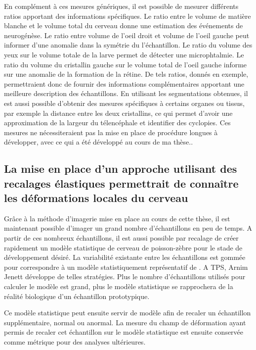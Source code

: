 \documentclass[\main/main.tex]{subfiles}
\begin{document}
En complément à ces mesures génériques, il est possible de mesurer différents ratios apportant des informations spécifiques. Le ratio entre le volume de matière blanche et le volume total du cerveau donne une estimation des événements de neurogénèse. Le ratio entre volume de l'oeil droit et volume de l'oeil gauche peut informer d'une anomalie dans la symétrie du l'échantillon. Le ratio du volume des yeux sur le volume totale de la larve permet de détecter une microphtalmie.
Le ratio du volume du cristallin gauche sur le volume total de l'oeil gauche informe sur une anomalie de la formation de la rétine.
%
De tels ratios, donnés en exemple, permettraient donc de fournir des informations complémentaires apportant une meilleure description des échantillons.
En utilisant les segmentations obtenues, il est aussi possible d'obtenir des mesures spécifiques à certains organes ou tissus, par exemple la distance entre les deux cristallins, ce qui permet d'avoir une approximation de la largeur du télencéphale et identifier des cyclopies.
Ces mesures ne nécessiteraient pas la mise en place de procédure longues à développer, avec ce qui a été développé au cours de ma thèse..

    \subsection{La mise en place d'un approche utilisant des recalages élastiques permettrait de connaître les déformations locales du cerveau}
    
Grâce à la méthode d'imagerie mise en place au cours de cette thèse,
il est maintenant possible d'imager un grand nombre d'échantillons en peu de temps. A partir de ces nombreux échantillons, il est aussi possible par recalage de créer rapidement un modèle statistique de cerveau de poisson-zèbre pour le stade de développement désiré. La variabilité existante entre les échantillons est gommée pour correspondre à un modèle statistiquement représentatif de \pz.
A TPS, Arnim Jenett développe de telles stratégies.
Plus le nombre d'échantillons utilisés pour calculer le modèle est grand, plus le modèle statistique se rapprochera de la réalité biologique d'un échantillon prototypique.

%
Ce modèle statistique peut ensuite servir de modèle afin de recaler un échantillon supplémentaire, normal ou anormal. La mesure du champ de déformation ayant permis de recaler cet échantillon sur le modèle statistique est ensuite conservée comme métrique pour des analyses ultérieures.
\end{document}
